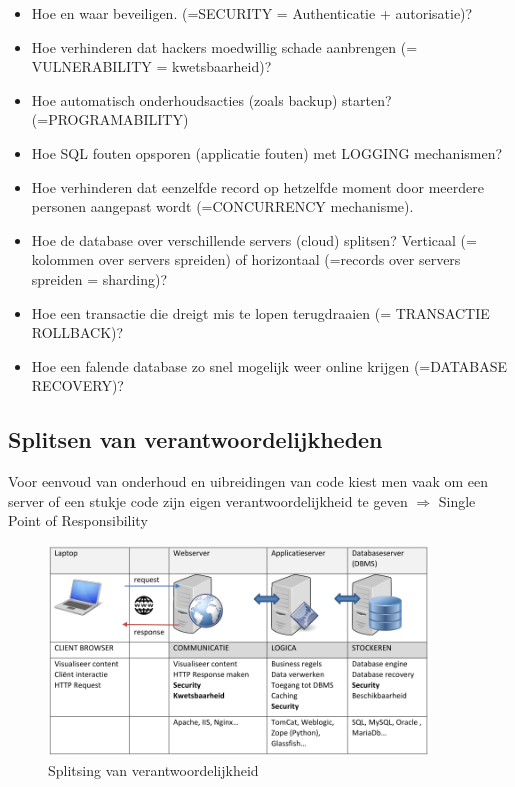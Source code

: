 \documentclass{article}
\begin{document}
\begin{itemize}
    \item Hoe en waar beveiligen. (=SECURITY = Authenticatie + autorisatie)?
    \item Hoe verhinderen dat hackers moedwillig schade aanbrengen (= VULNERABILITY = kwetsbaarheid)?
    \item Hoe automatisch onderhoudsacties (zoals backup) starten? (=PROGRAMABILITY)
    \item Hoe SQL fouten opsporen (applicatie fouten) met LOGGING mechanismen?
    \item Hoe verhinderen dat eenzelfde record op hetzelfde moment door meerdere personen aangepast wordt (=CONCURRENCY mechanisme).
    \item Hoe de database over verschillende servers (cloud) splitsen? Verticaal (= kolommen over servers spreiden) of horizontaal (=records over servers spreiden = sharding)?
    \item Hoe een transactie die dreigt mis te lopen terugdraaien (= TRANSACTIE ROLLBACK)?
    \item Hoe een falende database zo snel mogelijk weer online krijgen (=DATABASE RECOVERY)?
\end{itemize}

\subsection{Splitsen van verantwoordelijkheden}
Voor eenvoud van onderhoud en uibreidingen van code kiest men vaak om een server of een stukje code zijn eigen
verantwoordelijkheid te geven $\Rightarrow$ Single Point of Responsibility

\begin{figure}[H]
    \centering
    \includegraphics[width=0.9\textwidth]{Screenshot_20200429_135824.png}
    \caption{Splitsing van verantwoordelijkheid}
\end{figure}
\end{document}
